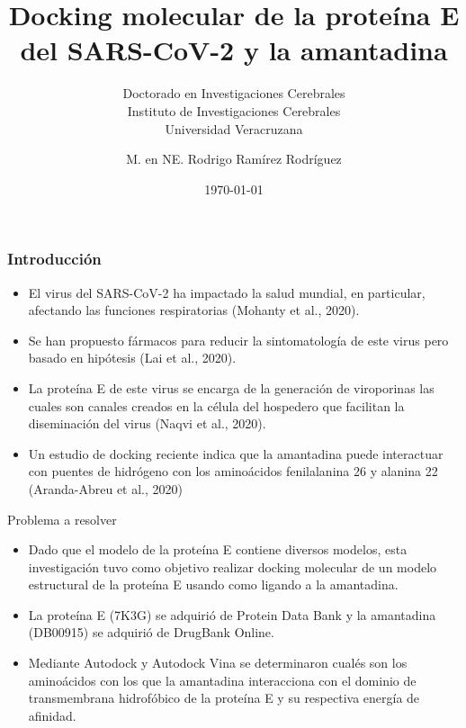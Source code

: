 \documentclass{beamer}
\begin{document}
\title{Docking molecular de la proteína E del SARS-CoV-2 y la amantadina}

\subtitle{Doctorado en Investigaciones Cerebrales \\ Instituto de Investigaciones Cerebrales \\Universidad Veracruzana}
\author{M. en NE. Rodrigo Ramírez Rodríguez}
\date{\today} 

\begin{frame}
\titlepage
\end{frame}

\begin{frame}
\frametitle{Introducción}
\begin{itemize}
    \item El virus del SARS-CoV-2 ha impactado la salud mundial, en particular, afectando las funciones respiratorias (Mohanty et al., 2020). 
    \item Se han propuesto fármacos para reducir la sintomatología de este virus pero basado en hipótesis (Lai et al., 2020).
    \item La proteína E de este virus se encarga de la generación de viroporinas las cuales son canales creados en la célula del hospedero que facilitan la diseminación del virus (Naqvi et al., 2020).
    \item Un estudio de docking reciente indica que la amantadina puede interactuar con puentes de hidrógeno con los aminoácidos fenilalanina 26 y alanina 22 (Aranda-Abreu et al., 2020)
\end{itemize} 

   
 
\end{frame}

%

\begin{frame}{Problema a resolver}
\begin{itemize}
    \item Dado que el modelo de la proteína E contiene diversos modelos, esta investigación tuvo como objetivo realizar docking molecular de un modelo estructural de la proteína E usando como ligando a la amantadina.
    \item La proteína E (7K3G) se adquirió de Protein Data Bank y la amantadina (DB00915) se adquirió de DrugBank Online.
    \item Mediante Autodock y Autodock Vina se determinaron cualés son los aminoácidos con los que la amantadina interacciona con el dominio de transmembrana hidrofóbico de la proteína E y su respectiva energía de afinidad.
    
\end{itemize}  
  
    
\end{frame}
\end{document}
